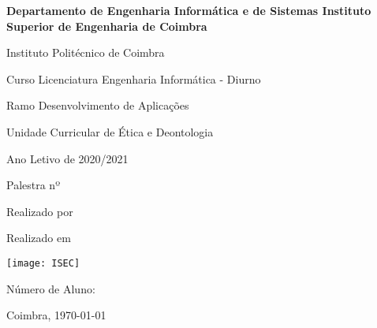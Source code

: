 
\begin{titlepage}
    \begin{flushright}
        \textbf{Departamento de Engenharia Informática e de Sistemas
            Instituto Superior de Engenharia de Coimbra}

        Instituto Politécnico de Coimbra
    \end{flushright}
    \begin{center}
        \vspace{0.5cm}
        \begin{large}
            \newcommand{\spacetitle}{0.0cm}

            Curso Licenciatura Engenharia Informática - Diurno
            \vspace{\spacetitle}

            Ramo Desenvolvimento de Aplicações
            \vspace{\spacetitle}

            Unidade Curricular de Ética e Deontologia
            \vspace{\spacetitle}

            Ano Letivo de 2020/2021
            \vspace{\spacetitle}

            \vfill

            Palestra nº \palestranumero

            \vspace{\spacetitle}
            \vspace{\spacetitle}
            \textbf{\palestratitulo}
            \vspace{\spacetitle}
            \vspace{\spacetitle}
            
            Realizado por \palestraautor

            Realizado em \palestradata

            \vfill

            \texttt{[image: ISEC]}
            \vfill

            \myauthor

            Número de Aluno: \mynumerodealuno

            Coimbra, \today
            \vspace{\spacetitle}

            \myauthor

        \end{large}
    \end{center}
\end{titlepage}